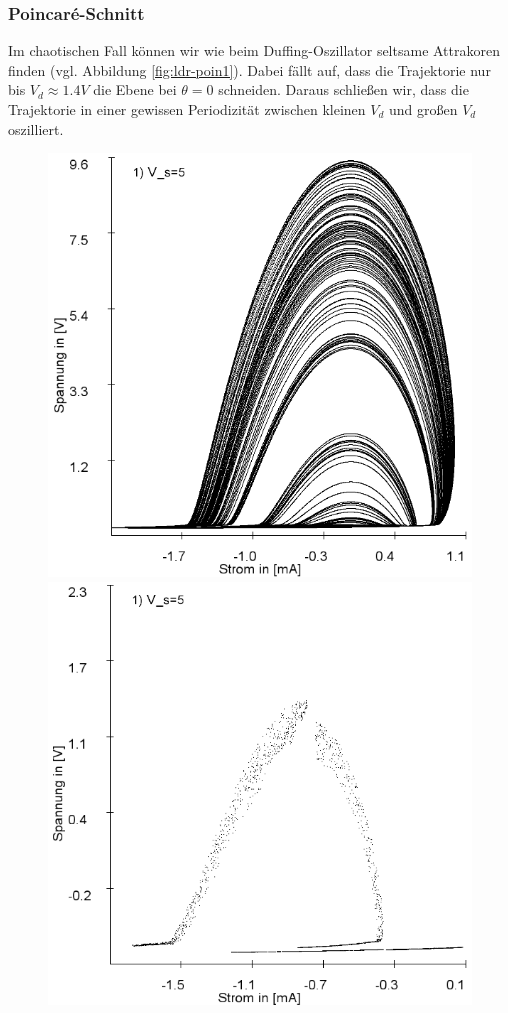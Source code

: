 \documentclass[12pt,a4paper]{article}
\begin{document}
\subsubsection{Poincaré-Schnitt}
 Im chaotischen Fall können wir wie beim Duffing-Oszillator seltsame Attrakoren finden (vgl. Abbildung \ref{fig:ldr-poin1}). Dabei fällt auf, dass die Trajektorie nur bis $V_d\approx1.4V$ die Ebene bei $\theta=0$ schneiden. Daraus schließen wir, dass die Trajektorie in einer gewissen Periodizität zwischen kleinen $V_d$ und großen $V_d$ oszilliert.
\begin{figure}[!htbp]
\centering
\includegraphics[scale=0.33]{schwing-v5-euler}
\includegraphics[scale=0.33]{schwing-v5-euler-poincare}

\end{figure}
\end{document}
